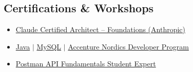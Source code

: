 \documentclass[letterpaper,10pt]{article}
\newcommand{\link}[2]{\href{#1}{\textcolor{accent}{#2}}}
\begin{document}
\begin{multicols}{2}
\section{Certifications \& Workshops}
\begin{itemize}[leftmargin=0.14in, label=\textbullet, nosep, itemsep=2pt]
  \small
  \item \link{https://www.credly.com/badges/708fc779-3ff4-47cb-90e1-b9b67bb68fb2/public_url}{Claude Certified Architect -- Foundations (Anthropic)}
  \item \link{https://drive.google.com/file/d/1LMBDrknzpRZ0OnbYsTMo8oOisqoqEKzi/view?usp=sharing}{Java} $|$
        \link{https://drive.google.com/file/d/1jF3zN1Ecp5yUa-SXFu_uIQ0HhCrE6xOG/view?usp=sharing}{MySQL} $|$ \link{https://drive.google.com/file/d/1KzjUFKgFwRoj2dWXHj9HKbljyRhAMUpI/view?usp=sharing}{Accenture Nordics Developer Program}
  \item \link{https://api.badgr.io/public/assertions/1fMtBEytRayXMeposAemSA}{Postman API Fundamentals Student Expert}
\end{itemize}

\end{multicols}
\end{document}
